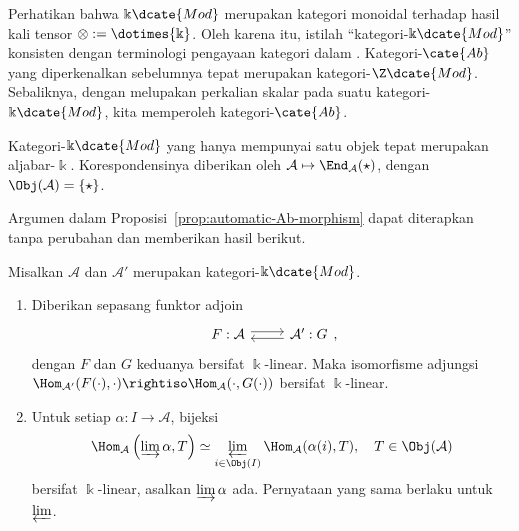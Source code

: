 Perhatikan bahwa $\Bbbk\dcate{Mod}$ merupakan kategori monoidal terhadap hasil
kali tensor $\otimes := \dotimes{\Bbbk}$. Oleh karena itu, istilah
``kategori-$\Bbbk\dcate{Mod}$'' konsisten dengan terminologi pengayaan kategori
dalam \cite[\S 3.4]{Li1}. Kategori-$\cate{Ab}$ yang diperkenalkan sebelumnya
tepat merupakan kategori-$\Z\dcate{Mod}$. Sebaliknya, dengan melupakan
perkalian skalar pada suatu kategori-$\Bbbk\dcate{Mod}$, kita memperoleh
kategori-$\cate{Ab}$.

\begin{contoh}
	Kategori-$\Bbbk\dcate{Mod}$ yang hanya mempunyai satu objek tepat
	merupakan aljabar-$\Bbbk$. Korespondensinya diberikan oleh
	$\mathcal{A} \mapsto \End_{\mathcal{A}}(\star)$, dengan
	$\Obj(\mathcal{A}) = \{\star\}$.
\end{contoh}

Argumen dalam Proposisi~\ref{prop:automatic-Ab-morphism} dapat diterapkan tanpa
perubahan dan memberikan hasil berikut.

\begin{proposisi}\label{prop:automatic-k-morphism}
	Misalkan $\mathcal{A}$ dan $\mathcal{A}'$ merupakan
	kategori-$\Bbbk\dcate{Mod}$.
	\begin{enumerate}
		\item Diberikan sepasang funktor adjoin
		\[
		\begin{tikzcd}
			F: \mathcal{A} \arrow[shift left, r] & \mathcal{A}' \arrow[shift left, l] : G
		\end{tikzcd},
		\]
		dengan $F$ dan $G$ keduanya bersifat $\Bbbk$-linear. Maka isomorfisme adjungsi
		$\Hom_{\mathcal{A}'}(F(\cdot),\cdot) \rightiso
		\Hom_{\mathcal{A}}(\cdot,G(\cdot))$ bersifat $\Bbbk$-linear.
		\item Untuk setiap $\alpha: I \to \mathcal{A}$, bijeksi
		\[
			\Hom_{\mathcal{A}}\left(\varinjlim \alpha,T\right)
			\simeq \varprojlim_{i \in \Obj(I)}
			\Hom_{\mathcal{A}}(\alpha(i),T),
			\quad T \in \Obj(\mathcal{A})
		\]
		bersifat $\Bbbk$-linear, asalkan $\varinjlim \alpha$ ada. Pernyataan yang sama
		berlaku untuk $\varprojlim$.
	\end{enumerate}
\end{proposisi}

